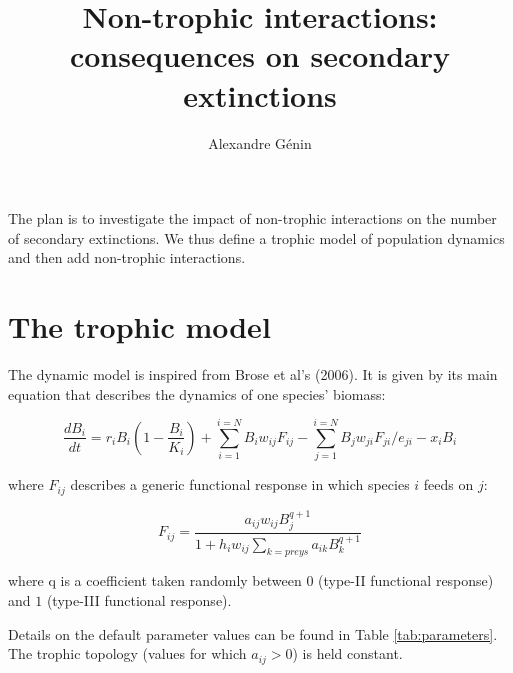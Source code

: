 \documentclass[a4paper,11pt]{article}
\title{Non-trophic interactions: consequences on secondary extinctions}
\author{Alexandre Génin}
\begin{document}
  
  \maketitle 
  
  The plan is to investigate the impact of non-trophic interactions on the 
number of secondary extinctions. We thus define a trophic model of population 
dynamics and then add non-trophic interactions. 
    
  \section{The trophic model}
      
      
      The dynamic model is inspired from Brose et al's (2006). It is given by 
its main equation that describes the dynamics of one species' biomass: 
    
    \begin{equation}
      \label{eq:popdyn}
      \frac{dB_i}{dt} =   r_iB_i(1 - \frac{B_i}{K_i}) 
                        + \sum_{i=1}^{i=N} B_i w_{ij} F_{ij} 
                        - \sum_{j=1}^{i=N} B_j w_{ji} F_{ji} / e_{ji} 
                        - x_i B_i 
    \end{equation}
    
    where $F_{ij}$ describes a generic functional response in which species $i$ 
feeds on $j$: 
    
    \begin{equation}
      F_{ij} = \frac{a_{ij} w_{ij} B_{j}^{q+1} }{ 
        1 + h_{i} w_{ij} \sum_{k=preys} a_{ik} B_{k}^{q+1} }
    \end{equation}
    
    where q is a coefficient taken randomly between $0$ (type-II functional 
response) and $1$ (type-III functional response).
    
    Details on the default parameter values can be found in Table 
\ref{tab:parameters}. The trophic topology (values for which $a_{ij}>0$) is held 
constant.
    
\end{document}

